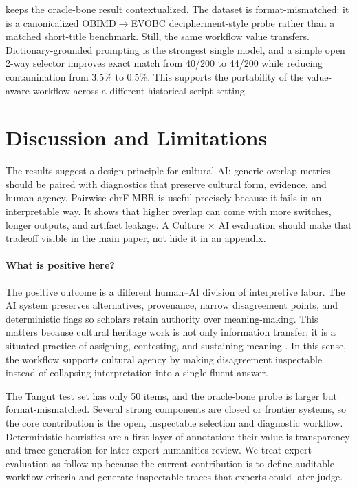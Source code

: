\documentclass{article}
\begin{document}
 keeps the oracle-bone result contextualized. The dataset is format-mismatched: it is a canonicalized OBIMD$\rightarrow$EVOBC decipherment-style probe rather than a matched short-title benchmark. Still, the same workflow value transfers. Dictionary-grounded prompting is the strongest single model, and a simple open 2-way selector improves exact match from 40/200 to 44/200 while reducing contamination from 3.5\% to 0.5\%. This supports the portability of the value-aware workflow across a different historical-script setting.

\section{Discussion and Limitations}

The results suggest a design principle for cultural AI: generic overlap metrics should be paired with diagnostics that preserve cultural form, evidence, and human agency. Pairwise chrF-MBR is useful precisely because it fails in an interpretable way. It shows that higher overlap can come with more switches, longer outputs, and artifact leakage. A Culture $\times$ AI evaluation should make that tradeoff visible in the main paper, not hide it in an appendix.

\paragraph{What is positive here?}
The positive outcome is a different human--AI division of interpretive labor. The AI system preserves alternatives, provenance, narrow disagreement points, and deterministic flags so scholars retain authority over meaning-making. This matters because cultural heritage work is not only information transfer; it is a situated practice of assigning, contesting, and sustaining meaning \citep{smith2006uses}. In this sense, the workflow supports cultural agency by making disagreement inspectable instead of collapsing interpretation into a single fluent answer.

The Tangut test set has only 50 items, and the oracle-bone probe is larger but format-mismatched. Several strong components are closed or frontier systems, so the core contribution is the open, inspectable selection and diagnostic workflow. Deterministic heuristics are a first layer of annotation: their value is transparency and trace generation for later expert humanities review. We treat expert evaluation as follow-up because the current contribution is to define auditable workflow criteria and generate inspectable traces that experts could later judge.
\end{document}

